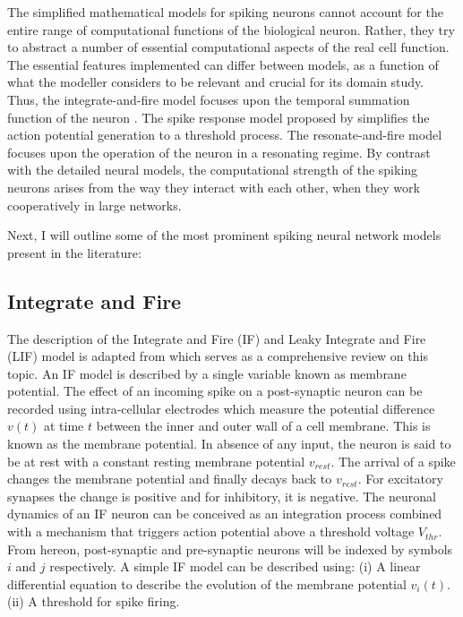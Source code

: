 \begin{enumerate}
The simplified mathematical models for spiking neurons cannot account for the entire range of computational functions of the biological neuron. Rather, they try to abstract a number of essential computational aspects of the real cell function. The essential features implemented can differ between models, as a function of what the modeller considers to be relevant and crucial for its domain study. Thus, the integrate-and-fire model focuses upon the temporal summation function of the neuron \citep{bugmann1997role}. The spike response model proposed by \citet{gerstner1998spiking} simplifies the action potential generation to a threshold process. The resonate-and-fire model \citep{izhikevich2001resonate} focuses upon the operation of the neuron in a resonating regime. By contrast with the detailed neural models, the computational strength of the spiking neurons arises from the way they interact with each other, when they work cooperatively in large networks.
\end{enumerate}

Next, I will outline some of the most prominent spiking neural network models present in the literature:

\subsection{Integrate and Fire}

The description of the Integrate and Fire (IF) and Leaky Integrate and Fire (LIF) model is adapted from \citep{gerstner2014neuronal} which serves as a comprehensive review on this topic. An IF model is described by a single variable known as membrane potential. The effect of an incoming spike on a post-synaptic neuron can be recorded using intra-cellular electrodes which measure the potential difference $v(t)$ at time $t$ between the inner and outer wall of a cell membrane. This is known as the membrane potential. In absence of any input, the neuron is said to be at rest with a constant resting membrane potential $v_{rest}$. The arrival of a spike changes the membrane potential and finally decays back to $v_{rest}$. For excitatory synapses the change is positive and for inhibitory, it is negative. The neuronal dynamics of an IF neuron can be conceived as an integration process combined with a mechanism that triggers action potential above a threshold voltage $V_{thr}$. From hereon, post-synaptic and pre-synaptic neurons will be indexed by symbols $i$ and $j$ respectively. A simple IF model can be described using: (i) A linear differential equation to describe the evolution of the membrane potential $v_i(t)$. (ii) A threshold for spike firing. 

